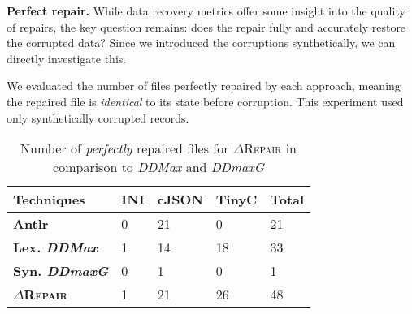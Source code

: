 \documentclass[acmsmall,screen,review,anonymous]{acmart}
\newcommand{\approach}{\textsc{$\Delta$Repair}\xspace}
\newcommand{\ddmax}{\textit{DDMax}\xspace}
\newcommand{\ddmaxg}{\textit{DDmaxG}\xspace}
\newcommand{\drepair}{\approach}
\begin{document}


%

\noindent\textbf{Perfect repair.} While data recovery metrics offer some insight
into the quality of repairs, the key question remains: does the repair fully and
accurately restore the corrupted data?
Since we introduced the corruptions synthetically, we can directly investigate
this.

We evaluated the number of files perfectly repaired by each approach, meaning
the repaired file is \emph{identical} to its state before corruption.
This experiment used only synthetically corrupted records.

\begin{table}[!tbp]\centering
\caption{Number of \textit{perfectly} repaired files for \approach in comparison to \ddmax and \ddmaxg
}
\begin{tabular}{|p{4.0cm}|p{1.5cm}|p{1.5cm}|p{1.5cm}|p{1.5cm}|}
\hline
\textbf{Techniques}&  \textbf{INI}&\textbf{cJSON} &\textbf{TinyC}&\textbf{Total}  \\
\hline
\textbf{Antlr}  & 0 & 21 & 0 & 21 \\
\textbf{Lex. \ddmax}  & 1 & 14 & 18 & 33 \\
\textbf{Syn. \ddmaxg} & 0 & 1  & 0  & 1  \\
\hline
\textbf{\approach} &  1 & 21  & 26 & 48  \\
\hline
\end{tabular}
\label{tab:perfectrepairs}
\end{table}
\end{document}
